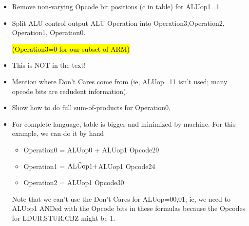 \begin{frame}[fragile]
	\begin{center}
	\end{center}
\begin{itemize}
\item  Remove non-varying Opcode bit positions (c in table) for ALUop1=1
\item Split ALU control output ALU Operation into Operation3,Operation2, Operation1, Operation0.

	\hl{(Operation3=0 for our subset of ARM)}
\end{itemize}

\BNotes\ifnum{}
\begin{itemize}
\item This is NOT in the text!

	\item Mention where Don't Cares come from (ie, ALUop=11 isn't used;
		many opcode bits are redudent information).
	      \item Show how to do full sum-of-products for Operation0.
              \item For complete language, table is bigger and minimized by
                machine.  For this example, we can do it by hand
	\begin{itemize}
		\item Operation0 = ALUop0 + ALUop1 Opcode29
		\item Operation1 = $\Bar{\mbox{ALUop1}}+$ALUop1 Opcode24
		\item Operation2 = ALUop1 Opcode30
	\end{itemize}
		Note that we can't use the Don't Cares for ALUop=00,01;
		ie, we need to ALUop1 ANDed with the Opcode bits in
		these formulas because the Opcodes for LDUR,STUR,CBZ might
		be 1.
\end{itemize}
\fi\ENotes
\end{frame}


